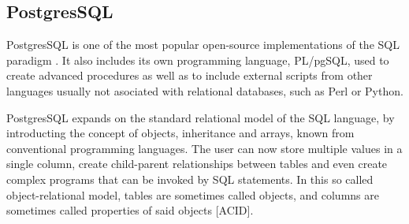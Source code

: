 \subsection{PostgresSQL}
\label{subsec:background:first_section:second_subsection}
\par PostgresSQL is one of the most popular open-source implementations of the SQL paradigm \citep{worsleyPostgresSQL}. It also includes its own programming language, PL/pgSQL, used to create advanced procedures as well as to include external scripts from other languages usually not asociated with relational databases, such as Perl or Python. 

\par PostgresSQL expands on the standard relational model of the SQL language, by introducting the concept of objects, inheritance and arrays, known from conventional programming languages. The user can now store multiple values in a single column, create child-parent relationships between tables and even create complex programs that can be invoked by SQL statements. In this so called object-relational model, tables are sometimes called objects, and columns are sometimes called properties of said objects [ACID].


